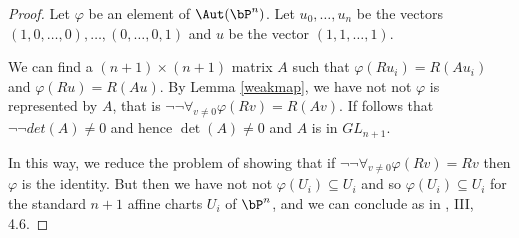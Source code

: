 \begin{proof}
  Let $\varphi$ be an element of $\Aut(\bP^n)$.
  Let $u_0,\dots,u_n$ be the vectors $(1,0,\dots,0), \dots, (0,\dots,0,1)$
  and $u$ be the vector $(1,1,\dots,1)$.

  We can find a $(n+1)\times (n+1)$ matrix $A$ such that $\varphi(R u_i) = R (Au_i)$
  and $\varphi(R u) = R (A u)$. By Lemma \ref{weakmap}, we have not not $\varphi$ is represented by $A$,
  that is $\neg\neg \forall_{v\neq 0}\varphi(R v) = R (Av)$. If follows that $\neg \neg det(A) \neq 0$
  and hence $\det(A)\neq 0$ and $A$ is in $GL_{n+1}$.

  In this way, we reduce the problem of showing that if $\neg\neg \forall_{v\neq 0}\varphi (R v) = R v$
  then $\varphi$ is the identity. But then we have not not $\varphi(U_i)\subseteq U_i$
  and so $\varphi(U_i)\subseteq U_i$ for the standard $n+1$ affine charts $U_i$ of $\bP^n$, and we can
  conclude as in \cite{Demazure}, III, 4.6.
\end{proof}
